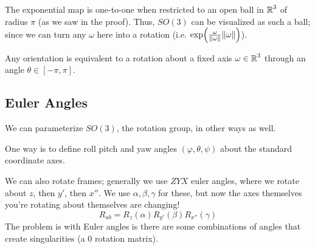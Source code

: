 The exponential map is one-to-one when restricted to an open ball
in $\operatorname{\mathbb{R}}^3$ of radius $\pi$ (as we saw in the proof).
Thus, $SO(3)$ can be visualized as such a ball; since we can
turn any $\omega$ here into a rotation (i.e. $\exp(\frac{\omega}{\norm{\omega}} \norm{\omega})$).

\begin{theorem}[Euler]
    Any orientation is equivalent to a rotation about a fixed axis $\omega \in \operatorname{\mathbb{R}}^3$ through an angle $\theta \in [- \pi, \pi]$.
\end{theorem}

\subsection{Euler Angles}

We can parameterize $SO(3)$, the rotation group, in other ways as well.

One way is to define roll pitch and yaw angles $(\varphi, \theta, \psi)$ about the standard coordinate axes.

We can also rotate frames; generally we use $ZYX$ euler angles, where we rotate about $z$, then $y'$, then $x''$.
We use $\alpha, \beta, \gamma$ for these, but now the axes themselves you're rotating about themselves are changing!
\[ R_{ab} = R_z(\alpha) R_{y'}(\beta) R_{x''}(\gamma) \]
The problem is with Euler angles is there are some combinations of angles that create singularities (a 0 rotation matrix).

